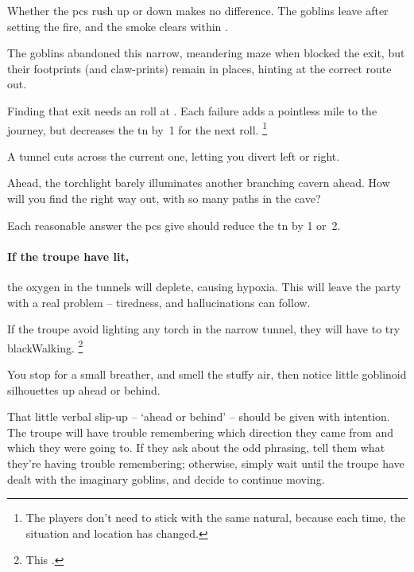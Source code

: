 \begin{multicols}{2}
Whether the \glspl{pc} rush up or down makes no difference.
The goblins leave after setting the fire, and the smoke clears within .



The goblins abandoned this narrow, meandering maze when  blocked the exit, but their footprints (and claw-prints) remain in places, hinting at the correct route out.

Finding that exit needs an  roll at \tn[10].
Each failure adds a pointless mile to the journey, but decreases the \gls{tn} by~1 for the next roll.%
\footnote{The players don't need to stick with the same \gls{natural}, because each time, the situation and location has changed.}

\begin{boxtext}
  A tunnel cuts across the current one, letting you divert left or right.

  Ahead, the torchlight barely illuminates another branching cavern ahead.
  How will you find the right way out, with so many paths in the cave?
\end{boxtext}

Each reasonable answer the \glspl{pc} give should reduce the \gls{tn} by 1 or~2.

\paragraph{If the troupe have  lit,}
the oxygen in the tunnels will deplete, causing \gls{hypoxia}.
This will leave the party with a real problem -- tiredness, and hallucinations can follow.

If the troupe avoid lighting any torch in the narrow tunnel, they will have to try \gls{blackWalking}.%
\footnote{This .}

\begin{boxtext}
  You stop for a small breather, and smell the stuffy air, then notice little goblinoid silhouettes up ahead or behind.
\end{boxtext}

That little verbal slip-up -- `ahead or behind' -- should be given with intention.
The troupe will have trouble remembering which direction they came from and which they were going to.
If they ask about the odd phrasing, tell them what they're having trouble remembering; otherwise, simply wait until the troupe have dealt with the imaginary goblins, and decide to continue moving.


\end{multicols}
